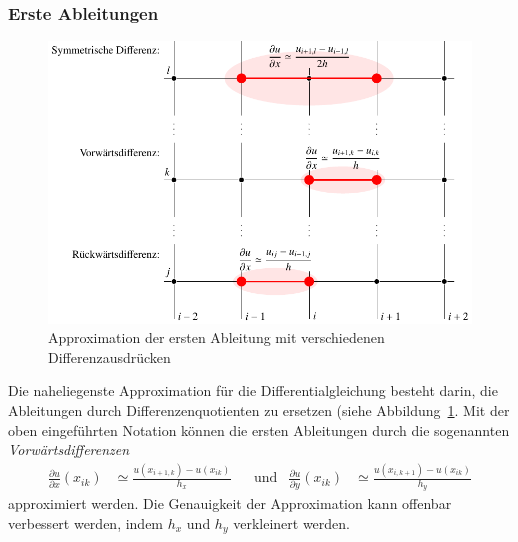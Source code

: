 \subsubsection{Erste Ableitungen}
\begin{figure}
\centering
\includegraphics{chapters/70-pde/images/derivatives.pdf}
\caption{Approximation der ersten Ableitung mit verschiedenen
Differenzausdrücken
\label{buch:pde:1abldiff}}
\end{figure}
Die naheliegenste Approximation für die Differentialgleichung besteht
darin, die Ableitungen durch Differenzenquotienten zu ersetzen (siehe 
Abbildung~\ref{buch:pde:1abldiff}.
Mit der oben eingeführten Notation können die ersten Ableitungen durch
die sogenannten {\em Vorwärtsdifferenzen}
%
\begin{align}
\frac{\partial u}{\partial x} (x_{ik}) 
&\simeq
\frac{u(x_{i+1,k}) - u(x_{ik})}{h_x}
&
&\text{und}
&
\frac{\partial u}{\partial y} (x_{ik}) 
&\simeq
\frac{u(x_{i,k+1}) - u(x_{ik})}{h_y}
\label{chapter:pde:approx1st}
\end{align}
approximiert werden.
Die Genauigkeit der Approximation kann offenbar verbessert werden, 
indem $h_x$ und $h_y$ verkleinert werden.

